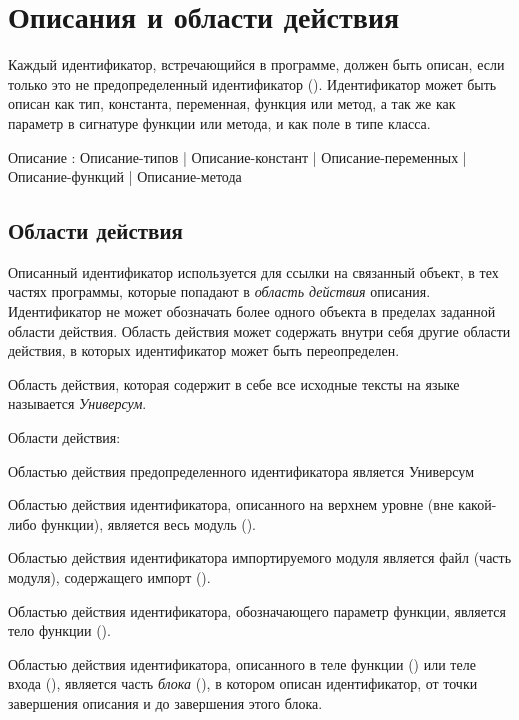 \hypertarget{decls}{%
\section{Описания и области действия}\label{decls:chapter}}

Каждый идентификатор, встречающийся в программе, должен быть описан, если только это
не предопределенный идентификатор (). 
Идентификатор может быть описан как тип, константа, переменная, функция или метод, 
а так же как параметр в сигнатуре функции или метода, и как поле в типе класса.

\begin{Grammar}
Описание
	: Описание-типов
	| Описание-констант
	| Описание-переменных
	| Описание-функций
	| Описание-метода
\end{Grammar} 

\hypertarget{scopes}{%
\subsection{Области действия}\label{decls:scopes}}

Описанный идентификатор используется для ссылки на связанный объект, в тех частях программы, которые попадают в \emph{область действия} описания. 
Идентификатор не может обозначать более одного объекта в пределах заданной области действия. 
Область действия может содержать внутри себя другие области действия, в которых идентификатор может быть переопределен.

Область действия, которая содержит в себе все исходные тексты на языке \thelang{} называется \emph{Универсум}.

Области действия:
\begin{d_itemize}
\item
Областью действия предопределенного идентификатора является Универсум
\item
Областью действия идентификатора, описанного на верхнем уровне (вне какой-либо функции), является весь модуль ().
\item
Областью действия идентификатора импортируемого модуля является файл (часть модуля), содержащего импорт ().
\item
Областью действия идентификатора, обозначающего параметр функции, является тело функции ().
\item
Областью действия идентификатора, описанного в теле функции () или теле входа (), является часть \emph{блока} (), в котором описан идентификатор, от точки завершения описания и до завершения этого блока. 
\end{d_itemize}

